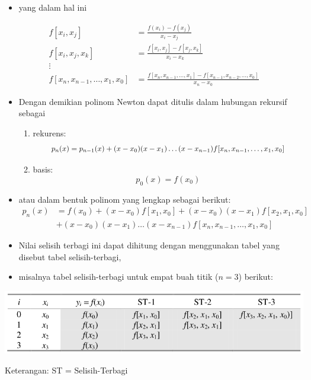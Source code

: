 \documentclass[pdflatex,compress,mathserif]{beamer}
\newcommand*{\Scale}[2][4]{\scalebox{#1}{$#2$}}%
\begin{document}
\begin{frame}
	\begin{itemize}
		\item yang dalam hal ini
	\end{itemize}
	\begin{align*}
		f[x_i, x_j] &= \frac{f(x_i)-f(x_j)}{x_i - x_j} \\
		f[x_i, x_j, x_k] &= \frac{f[x_i, x_j] - f[x_j, x_k]}{x_i - x_k} \\
		\vdots&\\
		f[x_n, x_{n-1}, \dots, x_1, x_0] &= \frac{f[x_n, x_{n-1}, \dots, x_1] - f[x_{n-1},x_{n-2},\dots, x_0]}{x_n - x_0}
	\end{align*}
\end{frame}

\begin{frame}
	\begin{itemize}
		\item Dengan demikian polinom Newton dapat ditulis dalam hubungan rekursif sebagai
		\begin{enumerate}
			\item rekurens:
			\[\Scale[0.9]{ p_n(x) = p_{n-1}(x) + (x-x_0 ) (x-x_1) \dots (x-x_{n-1}) f[x_n , x_{n-1} , \dots, x_1 , x_0] }\]
			\item basis:
			\[ p_0(x) = f (x_0) \]
		\end{enumerate}
		\item atau dalam bentuk polinom yang lengkap sebagai berikut:
		\begin{align*}
			p_n(x) &= f(x_0) + (x-x_0)f[x_1, x_0] + (x-x_0)(x-x_1) f[x_2, x_1, x_0] \\
			&+ (x - x_0) (x - x_1) \dots (x - x_{n-1}) f[x_n, x_{n-1} , \dots, x_1, x_0]
		\end{align*}
	\end{itemize}
\end{frame}

\begin{frame}
	\begin{itemize}
		\item Nilai selisih terbagi ini dapat dihitung dengan menggunakan tabel yang disebut tabel selisih-terbagi,
		\item misalnya tabel selisih-terbagi untuk empat buah titik ($ n = 3 $) berikut:
	\end{itemize}
	\begin{center}
		\includegraphics[width=\linewidth]{img/img11}
	\end{center}
	Keterangan: ST = Selisih-Terbagi
\end{frame}
\end{document}
